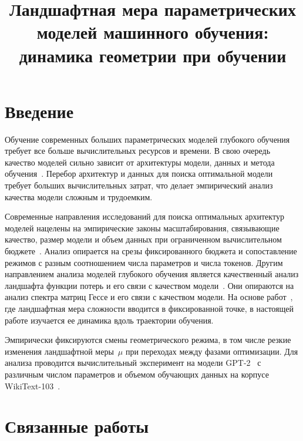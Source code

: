 \documentclass[11pt]{ubs}
\title{Ландшафтная мера параметрических моделей машинного обучения:
динамика геометрии при обучении}
\begin{document}
\maketitle

\section{Введение}
Обучение современных больших параметрических моделей глубокого обучения требует все больше вычислительных ресурсов и времени.
В свою очередь качество моделей сильно зависит от архитектуры модели, данных и метода обучения~\cite{kaplan2020,hoffmann2022}.
Перебор архитектур и данных для поиска оптимальной модели требует больших вычислительных затрат, что делает эмпирический анализ качества модели сложным и трудоемким.

Современные направления исследований для поиска оптимальных архитектур моделей нацелены на эмпирические законы масштабирования, связывающие качество, размер модели и объем данных при ограниченном вычислительном бюджете~\cite{kaplan2020,hoffmann2022}.
Анализ опирается на срезы фиксированного бюджета и сопоставление режимов с разным соотношением числа параметров и числа токенов.
Другим направлением анализа моделей глубокого обучения является качественный анализ ландшафта функции потерь и его связи с качеством модели~\cite{choromanska2015,li2018visualizing,fort2019emergent,fort2019large}.
Они опираются на анализ спектра матриц Гессе и его связи с качеством модели.
На основе работ~\cite{kiselev2024,meshkov2024ispras}, где ландшафтная мера сложности вводится в фиксированной точке, в настоящей работе изучается ее динамика вдоль траектории обучения.

Эмпирически фиксируются смены геометрического режима, в том числе резкие изменения ландшафтной меры~$\mu$ при переходах между фазами оптимизации.
Для анализа проводится вычислительный эксперимент на модели GPT-2~\cite{radford2019language} с различным числом параметров и объемом обучающих данных на корпусе WikiText-103~\cite{merity2016pointer}.

\section{Связанные работы}\label{sec:related}
\end{document}
